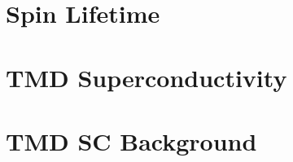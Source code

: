 \documentclass[oneside,12pt]{memoir}
\begin{document}
  \frontmatter{}
  
  
  
  \pagestyle{thesis}
  
  
  
  \newpage
  \tableofcontents
  \newpage
  \listoffigures
  \mainmatter{}
  

  \chapter{Spin Lifetime}
  
  
  
  
  
  

  \chapter{TMD Superconductivity}
  
  
  
  
  
  

  \chapter{TMD SC Background}
  
  
  
  
  
  
  
  
  \backmatter{}
  \SingleSpacing{}
  \printbibliography{}
\end{document}
